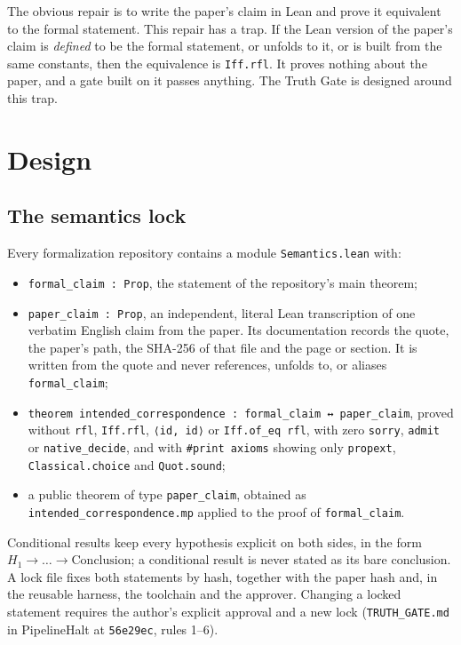 \documentclass[11pt,a4paper]{article}
\newcommand{\code}[1]{\texttt{#1}}
\begin{document}
The obvious repair is to write the paper's claim in Lean and prove it equivalent to the formal
statement. This repair has a trap. If the Lean version of the paper's claim is \emph{defined}
to be the formal statement, or unfolds to it, or is built from the same constants, then the
equivalence is \code{Iff.rfl}. It proves nothing about the paper, and a gate built on it passes
anything. The Truth Gate is designed around this trap.

\section{Design}
\label{sec:design}

\subsection{The semantics lock}

Every formalization repository contains a module \code{Semantics.lean} with:
\begin{itemize}
\item \code{formal\_claim : Prop}, the statement of the repository's main theorem;
\item \code{paper\_claim : Prop}, an independent, literal Lean transcription of one verbatim
  English claim from the paper. Its documentation records the quote, the paper's path, the
  SHA-256 of that file and the page or section. It is written from the quote and never
  references, unfolds to, or aliases \code{formal\_claim};
\item \code{theorem intended\_correspondence : formal\_claim ↔ paper\_claim}, proved without
  \code{rfl}, \code{Iff.rfl}, \code{⟨id, id⟩} or \code{Iff.of\_eq rfl}, with zero
  \code{sorry}, \code{admit} or \code{native\_decide}, and with \code{\#print axioms} showing
  only \code{propext}, \code{Classical.choice} and \code{Quot.sound};
\item a public theorem of type \code{paper\_claim}, obtained as
  \code{intended\_correspondence.mp} applied to the proof of \code{formal\_claim}.
\end{itemize}
Conditional results keep every hypothesis explicit on both sides, in the form
$H_1\to\dots\to\text{Conclusion}$; a conditional result is never stated as its bare conclusion.
A lock file fixes both statements by hash, together with the paper hash and, in the reusable
harness, the toolchain and the approver. Changing a locked statement requires the author's
explicit approval and a new lock (\code{TRUTH\_GATE.md} in PipelineHalt at \code{56e29ec},
rules 1--6).
\end{document}
